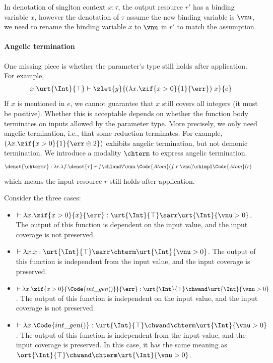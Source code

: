 In denotation of singlton context $x{:}\tau$, the output resource $r'$ has a binding variable $x$, however the denotation of $\tau$ assume the new binding variable is $\vnu$, we need to rename the binding variable $x$ to $\vnu$ in $r'$ to match the assumption.

\paragraph{Angelic termination} One missing piece is whether the parameter's type still holds after application. For example,
\begin{align*}
  x{:}\urt{\Int}{\top}\vdash \zlet{y}{(\lambda x.\zif{x > 0}{1}{\err})\;x}{e}
\end{align*}\noindent
If $x$ is mentioned in $e$, we cannot guarantee that $x$ still covers all integers (it must be positive). Whether this is acceptable depends on whether the function body terminates on inputs allowed by the parameter type. More precisely, we only need angelic termination, i.e., that some reduction terminates. For example, $(\lambda x.\zif{x > 0}{1}{\err \oplus 2})$ exhibits angelic termination, but not demonic termination. We introduce a modality $\chterm$ to express angelic termination.
\begin{align*}
  \denot{\chterm \tau} &: \lambda r.\lambda f. \denot{\tau}\;r\;f \chland \forall \vnu.\Code{Atom}(f\;r\;\vnu) \chimpl \Code{Atom}(r)
\end{align*}\noindent
which means the input resource $r$ still holds after application.

\begin{example} Consider the three cases:
\begin{itemize}
  \item $\vdash \lambda x.\zif{x > 0}{x}{\err} : \urt{\Int}{\top}\sarr \urt{\Int}{\vnu > 0}$. The output of this function is dependent on the input value, and the input coverage is not preserved.
  \item $\vdash \lambda x.x : \urt{\Int}{\top}\sarr \chterm \urt{\Int}{\vnu > 0}$. The output of this function is independent from the input value, and the input coverage is preserved.
  \item $\vdash \lambda x.\zif{x > 0}{\Code{int\_gen()}}{\err} : \urt{\Int}{\top}\chwand \urt{\Int}{\vnu > 0}$. The output of this function is independent on the input value, and the input coverage is not preserved.
  \item $\vdash \lambda x.\Code{int\_gen()} : \urt{\Int}{\top}\chwand \chterm \urt{\Int}{\vnu > 0}$. The output of this function is independent from the input value, and the input coverage is preserved. In this case, it has the same meaning as $\ort{\Int}{\top}\chwand \chterm \urt{\Int}{\vnu > 0}$.
\end{itemize}
\end{example}

